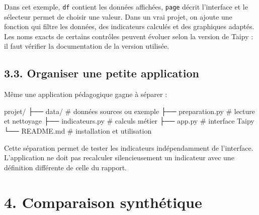 \documentclass[
  french,
  letterpaper,
  open=any]{scrbook}
\newenvironment{Shaded}{\begin{snugshade}}{\end{snugshade}}
\newcommand{\NormalTok}[1]{\textcolor[rgb]{0.00,0.23,0.31}{#1}}
\theoremstyle{definition}
\theoremstyle{definition}
\theoremstyle{remark}
\begin{document}
Dans cet exemple, \texttt{df} contient les données affichées,
\texttt{page} décrit l'interface et le sélecteur permet de choisir une
valeur. Dans un vrai projet, on ajoute une fonction qui filtre les
données, des indicateurs calculés et des graphiques adaptés. Les noms
exacts de certains contrôles peuvent évoluer selon la version de Taipy :
il faut vérifier la documentation de la version utilisée.

\subsection{3.3. Organiser une petite
application}\label{organiser-une-petite-application}

Même une application pédagogique gagne à séparer :

\begin{Shaded}
\begin{Highlighting}[]
\NormalTok{projet/}
\NormalTok{├── data/              \# données sources ou exemple}
\NormalTok{├── preparation.py     \# lecture et nettoyage}
\NormalTok{├── indicateurs.py     \# calculs métier}
\NormalTok{├── app.py             \# interface Taipy}
\NormalTok{└── README.md          \# installation et utilisation}
\end{Highlighting}
\end{Shaded}

Cette séparation permet de tester les indicateurs indépendamment de
l'interface. L'application ne doit pas recalculer silencieusement un
indicateur avec une définition différente de celle du rapport.

\section{4. Comparaison synthétique}\label{comparaison-synthuxe9tique}
\end{document}
